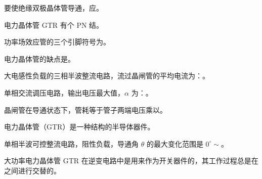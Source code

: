\documentclass[电力电子]{subfiles}
\begin{document}
\begin{ti}
	要使绝缘双极晶体管导通，应。
\end{ti}

\begin{ti}
	电力晶体管 GTR 有个 PN 结。
\end{ti}

\begin{ti}
	功率场效应管的三个引脚符号为。
\end{ti}

\begin{ti}
	电力晶体管的缺点是。
\end{ti}

\begin{ti}
	大电感性负载的三相半波整流电路，流过晶闸管的平均电流为：。
\end{ti}

\begin{ti}
	单相交流调压电路，输出电压最大值，$\alpha$ 为：。
\end{ti}

\begin{ti}
	晶闸管在导通状态下，管耗等于管子两端电压乘以。
\end{ti}

\begin{ti}
	电力晶体管（GTR）是一种结构的半导体器件。
\end{ti}

\begin{ti}
	单相半波可控整流电路，阻性负载，导通角 $\theta$ 的最大变化范围是 $0^\circ \sim $。
\end{ti}

\begin{ti}
	大功率电力晶体管 GTR 在逆变电路中是用来作为开关器件的，其工作过程总是在之间进行交替的。
\end{ti}
\end{document}
